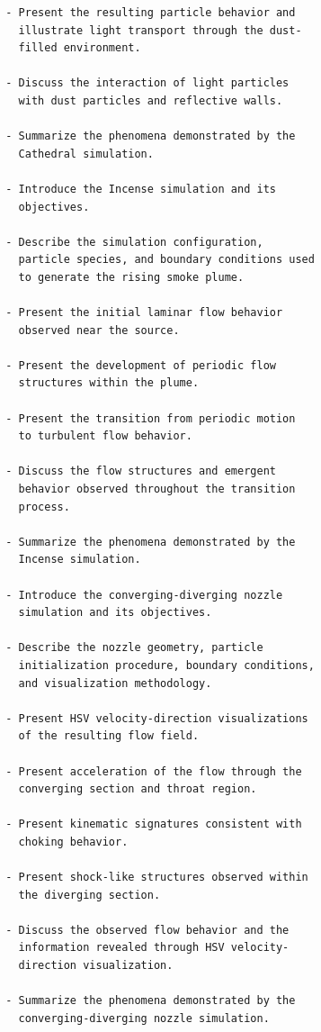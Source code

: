 \begin{verbatim}
        - Present the resulting particle behavior and
          illustrate light transport through the dust-
          filled environment.

        - Discuss the interaction of light particles
          with dust particles and reflective walls.

        - Summarize the phenomena demonstrated by the
          Cathedral simulation.

        - Introduce the Incense simulation and its
          objectives.

        - Describe the simulation configuration,
          particle species, and boundary conditions used
          to generate the rising smoke plume.

        - Present the initial laminar flow behavior
          observed near the source.

        - Present the development of periodic flow
          structures within the plume.

        - Present the transition from periodic motion
          to turbulent flow behavior.

        - Discuss the flow structures and emergent
          behavior observed throughout the transition
          process.

        - Summarize the phenomena demonstrated by the
          Incense simulation.

        - Introduce the converging-diverging nozzle
          simulation and its objectives.

        - Describe the nozzle geometry, particle
          initialization procedure, boundary conditions,
          and visualization methodology.

        - Present HSV velocity-direction visualizations
          of the resulting flow field.

        - Present acceleration of the flow through the
          converging section and throat region.

        - Present kinematic signatures consistent with
          choking behavior.

        - Present shock-like structures observed within
          the diverging section.

        - Discuss the observed flow behavior and the
          information revealed through HSV velocity-
          direction visualization.

        - Summarize the phenomena demonstrated by the
          converging-diverging nozzle simulation.


\end{verbatim}
